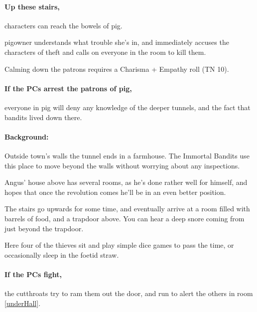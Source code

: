 \begin{multicols}{2}
\label{sewerPigWalk}

\paragraph{Up these stairs,}
characters can reach the bowels of \gls{pig}.

\Gls{pigowner} understands what trouble she's in, and immediately accuses the characters of theft and calls on everyone in the room to kill them.

Calming down the patrons requires a Charisma + Empathy roll (TN 10).

\paragraph{If the PCs arrest the patrons of \gls{pig},}
everyone in \gls{pig} will deny any knowledge of the deeper tunnels, and the fact that bandits lived down there.

\label{farmExit}

\paragraph{Background:}
Outside \gls{town}'s walls the tunnel ends in a farmhouse.
The Immortal Bandits use this place to move beyond the walls without worrying about any inspections.

Angus' house above has several rooms, as he's done rather well for himself, and hopes that once the revolution comes he'll be in an even better position.

\begin{boxtext}

  The stairs go upwards for some time, and eventually arrive at a room filled with barrels of food, and a trapdoor above.
  You can hear a deep snore coming from just beyond the trapdoor.

\end{boxtext}


\label{underGuard}

Here four of the thieves sit and play simple dice games to pass the time, or occasionally sleep in the foetid straw.

\paragraph{If the PCs fight,}
the cutthroats try to ram them out the door, and run to alert the others in room \ref{underHall}.


\end{multicols}
